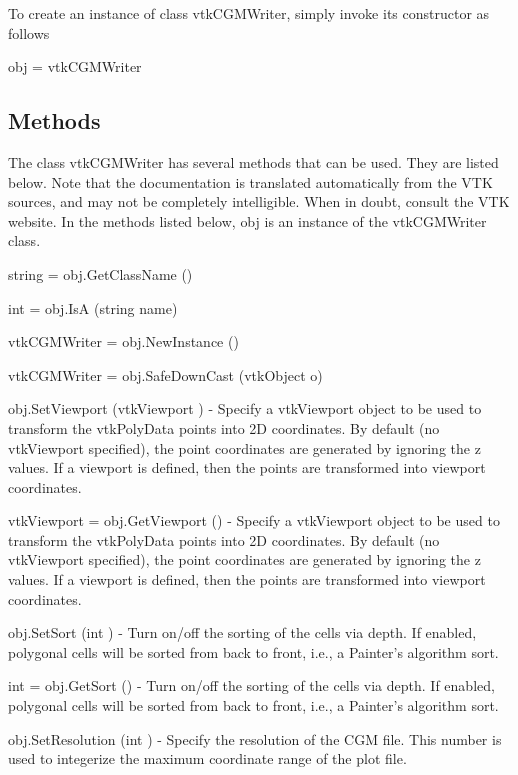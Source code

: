 To create an instance of class vtk\-C\-G\-M\-Writer, simply invoke its constructor as follows \begin{DoxyVerb}  obj = vtkCGMWriter
\end{DoxyVerb}
 \hypertarget{vtkwidgets_vtkxyplotwidget_Methods}{}\subsection{Methods}\label{vtkwidgets_vtkxyplotwidget_Methods}
The class vtk\-C\-G\-M\-Writer has several methods that can be used. They are listed below. Note that the documentation is translated automatically from the V\-T\-K sources, and may not be completely intelligible. When in doubt, consult the V\-T\-K website. In the methods listed below, {\ttfamily obj} is an instance of the vtk\-C\-G\-M\-Writer class. 
\begin{DoxyItemize}
\item {\ttfamily string = obj.\-Get\-Class\-Name ()}  
\item {\ttfamily int = obj.\-Is\-A (string name)}  
\item {\ttfamily vtk\-C\-G\-M\-Writer = obj.\-New\-Instance ()}  
\item {\ttfamily vtk\-C\-G\-M\-Writer = obj.\-Safe\-Down\-Cast (vtk\-Object o)}  
\item {\ttfamily obj.\-Set\-Viewport (vtk\-Viewport )} -\/ Specify a vtk\-Viewport object to be used to transform the vtk\-Poly\-Data points into 2\-D coordinates. By default (no vtk\-Viewport specified), the point coordinates are generated by ignoring the z values. If a viewport is defined, then the points are transformed into viewport coordinates.  
\item {\ttfamily vtk\-Viewport = obj.\-Get\-Viewport ()} -\/ Specify a vtk\-Viewport object to be used to transform the vtk\-Poly\-Data points into 2\-D coordinates. By default (no vtk\-Viewport specified), the point coordinates are generated by ignoring the z values. If a viewport is defined, then the points are transformed into viewport coordinates.  
\item {\ttfamily obj.\-Set\-Sort (int )} -\/ Turn on/off the sorting of the cells via depth. If enabled, polygonal cells will be sorted from back to front, i.\-e., a Painter's algorithm sort.  
\item {\ttfamily int = obj.\-Get\-Sort ()} -\/ Turn on/off the sorting of the cells via depth. If enabled, polygonal cells will be sorted from back to front, i.\-e., a Painter's algorithm sort.  
\item {\ttfamily obj.\-Set\-Resolution (int )} -\/ Specify the resolution of the C\-G\-M file. This number is used to integerize the maximum coordinate range of the plot file.  

\end{DoxyItemize}
